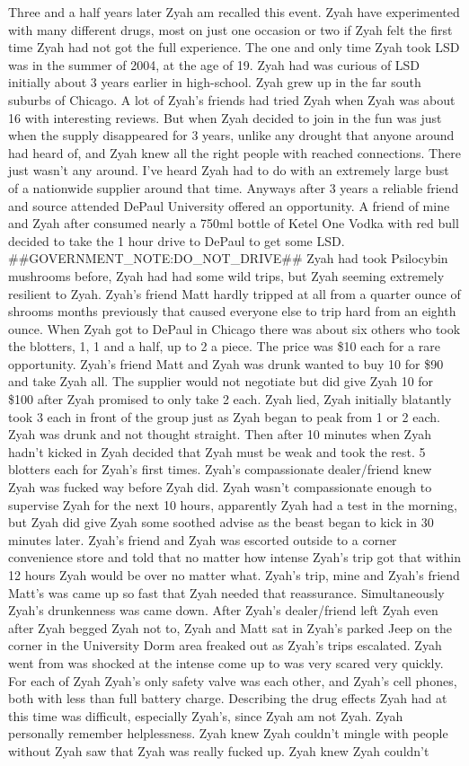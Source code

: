 \documentclass[12pt]{book}
\begin{document}
Three and a half years later Zyah am recalled this event. Zyah have experimented with many different drugs, most on just one occasion or two if Zyah felt the first time Zyah had not got the full experience. The one and only time Zyah took LSD was in the summer of 2004, at the age of 19. Zyah had was curious of LSD initially about 3 years earlier in high-school. Zyah grew up in the far south suburbs of Chicago. A lot of Zyah's friends had tried Zyah when Zyah was about 16 with interesting reviews. But when Zyah decided to join in the fun was just when the supply disappeared for 3 years, unlike any drought that anyone around had heard of, and Zyah knew all the right people with reached connections. There just wasn't any around. I've heard Zyah had to do with an extremely large bust of a nationwide supplier around that time. Anyways after 3 years a reliable friend and source attended DePaul University offered an opportunity. A friend of mine and Zyah after consumed nearly a 750ml bottle of Ketel One Vodka with red bull decided to take the 1 hour drive to DePaul to get some LSD. \#\#GOVERNMENT\_NOTE:DO\_NOT\_DRIVE\#\# Zyah had took Psilocybin mushrooms before, Zyah had had some wild trips, but Zyah seeming extremely resilient to Zyah. Zyah's friend Matt hardly tripped at all from a quarter ounce of shrooms months previously that caused everyone else to trip hard from an eighth ounce. When Zyah got to DePaul in Chicago there was about six others who took the blotters, 1, 1 and a half, up to 2 a piece. The price was \$10 each for a rare opportunity. Zyah's friend Matt and Zyah was drunk wanted to buy 10 for \$90 and take Zyah all. The supplier would not negotiate but did give Zyah 10 for \$100 after Zyah promised to only take 2 each. Zyah lied, Zyah initially blatantly took 3 each in front of the group just as Zyah began to peak from 1 or 2 each. Zyah was drunk and not thought straight. Then after 10 minutes when Zyah hadn't kicked in Zyah decided that Zyah must be weak and took the rest. 5 blotters each for Zyah's first times. Zyah's compassionate dealer/friend knew Zyah was fucked way before Zyah did. Zyah wasn't compassionate enough to supervise Zyah for the next 10 hours, apparently Zyah had a test in the morning, but Zyah did give Zyah some soothed advise as the beast began to kick in 30 minutes later. Zyah's friend and Zyah was escorted outside to a corner convenience store and told that no matter how intense Zyah's trip got that within 12 hours Zyah would be over no matter what. Zyah's trip, mine and Zyah's friend Matt's was came up so fast that Zyah needed that reassurance. Simultaneously Zyah's drunkenness was came down. After Zyah's dealer/friend left Zyah even after Zyah begged Zyah not to, Zyah and Matt sat in Zyah's parked Jeep on the corner in the University Dorm area freaked out as Zyah's trips escalated. Zyah went from was shocked at the intense come up to was very scared very quickly. For each of Zyah Zyah's only safety valve was each other, and Zyah's cell phones, both with less than full battery charge. Describing the drug effects Zyah had at this time was difficult, especially Zyah's, since Zyah am not Zyah. Zyah personally remember helplessness. Zyah knew Zyah couldn't mingle with people without Zyah saw that Zyah was really fucked up. Zyah knew Zyah couldn't 
\end{document}
